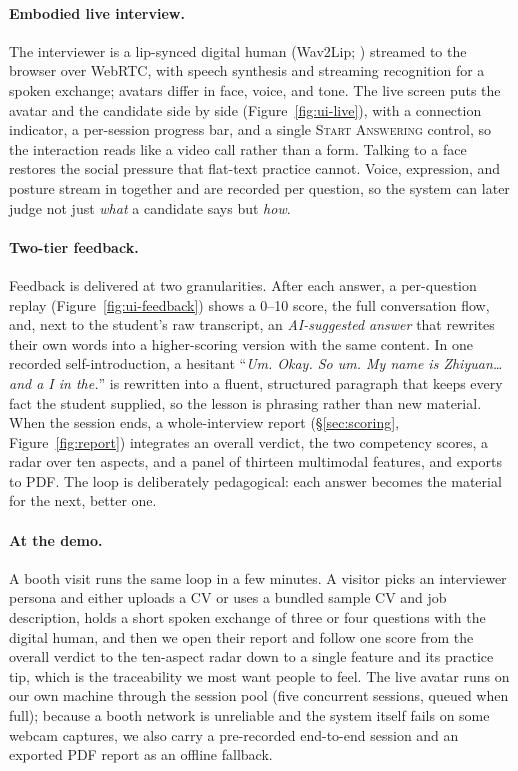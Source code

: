 \documentclass[11pt]{article}
\begin{document}
\paragraph{Embodied live interview.} The interviewer is a lip-synced digital human (Wav2Lip; \citealp{prajwal2020wav2lip}) streamed to the browser over WebRTC, with speech synthesis and streaming recognition for a spoken exchange; avatars differ in face, voice, and tone. The live screen puts the avatar and the candidate side by side (Figure~\ref{fig:ui-live}), with a connection indicator, a per-session progress bar, and a single \textsc{Start Answering} control, so the interaction reads like a video call rather than a form. Talking to a face restores the social pressure that flat-text practice cannot. Voice, expression, and posture stream in together and are recorded per question, so the system can later judge not just \emph{what} a candidate says but \emph{how}.

\paragraph{Two-tier feedback.} Feedback is delivered at two granularities. After each answer, a per-question replay (Figure~\ref{fig:ui-feedback}) shows a 0--10 score, the full conversation flow, and, next to the student's raw transcript, an \emph{AI-suggested answer} that rewrites their own words into a higher-scoring version with the same content. In one recorded self-introduction, a hesitant ``\emph{Um. Okay. So um. My name is Zhiyuan\ldots and a I in the.}'' is rewritten into a fluent, structured paragraph that keeps every fact the student supplied, so the lesson is phrasing rather than new material. When the session ends, a whole-interview report (\S\ref{sec:scoring}, Figure~\ref{fig:report}) integrates an overall verdict, the two competency scores, a radar over ten aspects, and a panel of thirteen multimodal features, and exports to PDF. The loop is deliberately pedagogical: each answer becomes the material for the next, better one.

\paragraph{At the demo.} A booth visit runs the same loop in a few minutes. A visitor picks an interviewer persona and either uploads a CV or uses a bundled sample CV and job description, holds a short spoken exchange of three or four questions with the digital human, and then we open their report and follow one score from the overall verdict to the ten-aspect radar down to a single feature and its practice tip, which is the traceability we most want people to feel. The live avatar runs on our own machine through the session pool (five concurrent sessions, queued when full); because a booth network is unreliable and the system itself fails on some webcam captures, we also carry a pre-recorded end-to-end session and an exported PDF report as an offline fallback.
\end{document}
